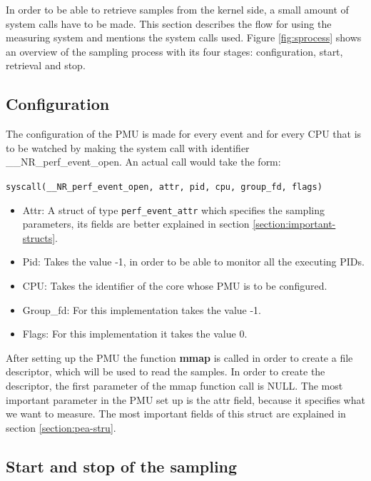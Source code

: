 In order to be able to retrieve samples from the kernel side, a small amount of system calls have to be made. This section describes the flow for using the measuring system and mentions the system calls used. Figure \ref{fig:sprocess} shows an overview of the sampling process with its four stages: configuration, start, retrieval and stop.

\subsection{Configuration}\label{section:confgtn}
The configuration of the PMU is made for every event and for every CPU that is to be watched by making the system call with identifier \_\_NR\_perf\_event\_open. An actual call would take the form: 
\\
\begin{center}
\texttt{syscall(\_\_NR\_perf\_event\_open, attr, pid, cpu, group\_fd, flags) }
\end{center}

\begin{itemize}
	\item Attr: A struct of type \texttt{perf\_event\_attr} which specifies the sampling parameters, its fields are better explained in section \ref{section:important-structs}. 
	\item Pid: Takes the value -1, in order to be able to monitor all the executing PIDs.
	\item CPU: Takes the identifier of the core whose PMU is to be configured.
	\item Group\_fd: For this implementation takes the value -1.
	\item Flags: For this implementation it takes the value 0.
\end{itemize}

After setting up the PMU the function \textbf{mmap} is called in order to create a file descriptor, which will be used to read the samples. In order to create the descriptor, the first parameter of the mmap function call is NULL. The most important parameter in the PMU set up is the attr field, because it specifies what we want to measure. The most important fields of this struct are explained in section \ref{section:pea-stru}.  

\subsection{Start and stop of the sampling}\label{section:start-sto}

